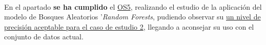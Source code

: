 \paragraph{}
En el apartado  \textbf{se ha cumplido} el \hyperref[os:OS5]{OS5}, realizando el estudio de la aplicación del modelo de Bosques Aleatorios '\textit{Random Forests}, pudiendo observar su \hyperref[resultados:rf]{un nivel de precisión aceptable para el caso de estudio 2}, llegando a aconsejar su uso con el conjunto de datos actual.
